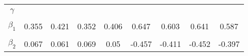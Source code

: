 \begin{footnotesize}
\begin{singlespace}
\begin{tabular}{ccccccccc}
 & \begin{tiny} [0.004,0.01] \end{tiny}  & \begin{tiny} [0.117,0.176] \end{tiny}  & \begin{tiny} [0.004,0.01] \end{tiny}  & \begin{tiny} [0.011,0.033] \end{tiny}  & \begin{tiny} [0.037,0.076] \end{tiny}  & \begin{tiny} [0.188,0.274] \end{tiny}  & \begin{tiny} [0.035,0.072] \end{tiny}  & \begin{tiny} [0.097,0.161] \end{tiny}  \\ 
$\gamma$ &  &  &  &  &  &  &  &  \\ 
 &  &  &  &  &  &  &  &  \\ 
$ \beta_{1} $ & 0.355 & 0.421 & 0.352 & 0.406 & 0.647 & 0.603 & 0.641 & 0.587 \\ 
 & \begin{tiny} [0.268,0.443] \end{tiny}  & \begin{tiny} [0.36,0.481] \end{tiny}  & \begin{tiny} [0.264,0.441] \end{tiny}  & \begin{tiny} [0.325,0.485] \end{tiny}  & \begin{tiny} [0.553,0.739] \end{tiny}  & \begin{tiny} [0.536,0.671] \end{tiny}  & \begin{tiny} [0.548,0.733] \end{tiny}  & \begin{tiny} [0.518,0.656] \end{tiny}  \\ 
$ \beta_{2} $ & 0.067 & 0.061 & 0.069 & 0.05 & -0.457 & -0.411 & -0.452 & -0.397 \\ 

\end{tabular}
\end{singlespace}
\end{footnotesize}
